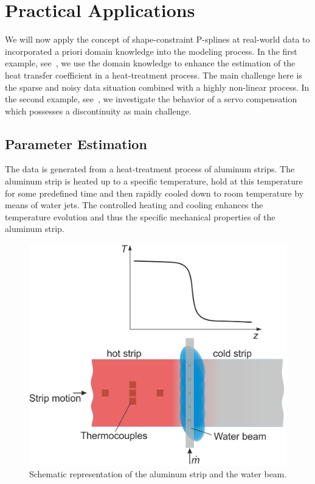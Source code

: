 \chapter{Practical Applications} \label{cha:practical-appl}

We will now apply the concept of shape-constraint P-splines at real-world data to incorporated a priori domain knowledge into the modeling process. In the first example, see~, we use the domain knowledge to enhance the estimation of the heat transfer coefficient in a heat-treatment process. The main challenge here is the sparse and noisy data situation combined with a highly non-linear process. In the second example, see~, we investigate the behavior of a servo compensation which possesses a discontinuity as main challenge.  

\section{Parameter Estimation} \label{sec:real-world-application}

The data is generated from a heat-treatment process of aluminum strips. The aluminum strip is heated up to a specific temperature, hold at this temperature for some predefined time and then rapidly cooled down to room temperature by means of water jets. The controlled heating and cooling enhances the temperature evolution  and thus the specific mechanical properties of the aluminum strip. 

\begin{figure}[H]
	\centering
	\includegraphics[width=0.8\columnwidth]{graphics/pgfplots/cha5/Ebner/Water_Beam.png}
	\caption{Schematic representation of the aluminum strip and the water beam.}
	\label{fig:ebner_water_beam}
\end{figure}

